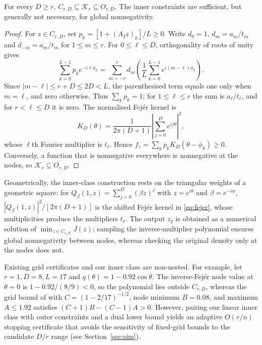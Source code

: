 \begin{proposition}\label{prop:classes}
For every \(D\ge r\), \(C_{r,D}\subseteq\mathcal K_r\subseteq O_{r,D}\). The inner constraints are sufficient, but generally not necessary, for global nonnegativity.
\end{proposition}
\begin{proof}
For \(z\in C_{r,D}\), set \(p_k=[1+(A_Iz)_k]/L\ge0\). Write \(d_0=1\), \(d_m=a_m/t_m\) and \(d_{-m}=\overline{a_m}/t_m\) for \(1\le m\le r\). For \(0\le\ell\le D\), orthogonality of roots of unity gives
\[
\sum_{k=0}^{L-1}p_ke^{-i\ell\phi_k}
=\sum_{m=-r}^{r}d_m\left(\frac1L\sum_{k=0}^{L-1}e^{i(m-\ell)\phi_k}\right).
\]
Since \(|m-\ell|\le r+D\le2D<L\), the parenthesised term equals one only when \(m=\ell\), and zero otherwise. Thus \(\sum_kp_k=1\); for \(1\le\ell\le r\) the sum is \(a_\ell/t_\ell\), and for \(r<\ell\le D\) it is zero. The normalised Fejér kernel is
\begin{equation}
K_D(\theta)=\frac{1}{2\pi(D+1)}\left|\sum_{j=0}^De^{ij\theta}\right|^2,
\label{eq:fejer}
\end{equation}
whose \(\ell\)th Fourier multiplier is \(t_\ell\). Hence \(f_z=\sum_k p_kK_D(\theta-\phi_k)\ge0\). Conversely, a function that is nonnegative everywhere is nonnegative at the nodes, so \(\mathcal K_r\subseteq O_{r,D}\).
\end{proof}

Geometrically, the inner-class construction rests on the triangular weights of a geometric square: for \(Q_\beta(1,z)=\sum_{j=0}^{D}(\beta z)^j\) with \(z=e^{i\theta}\) and \(\beta=e^{-i\phi}\), \(|Q_\beta(1,z)|^2/[2\pi(D+1)]\) is the shifted Fejér kernel in \eqref{eq:fejer}, whose multiplicities produce the multipliers \(t_\ell\). The output \(z_I\) is obtained as a numerical solution of \(\min_{z\in C_{r,D}}J(z)\); sampling the inverse-multiplier polynomial ensures global nonnegativity between nodes, whereas checking the original density only at the nodes does not.

Existing grid certificates and our inner class are non-nested. For example, let \(r=1,D=8,L=17\) and \(q(\theta)=1-0.92\cos\theta\). The inverse-Fejér node value at \(\theta=0\) is \(1-0.92/(8/9)<0\), so the polynomial lies outside \(C_{r,D}\), whereas the grid bound of \citet{pfister2019} with \(C=(1-2/17)^{-1/2}\), node minimum \(B=0.08\), and maximum \(A\le1.92\) satisfies \((C+1)B-(C-1)A>0\). However, pairing our linear inner class with outer constraints and a dual lower bound yields an adaptive \(O(r/n)\) stopping certificate that avoids the sensitivity of fixed-grid bounds to the candidate \(D/r\) range (see Section~\ref{sec:sim}).


